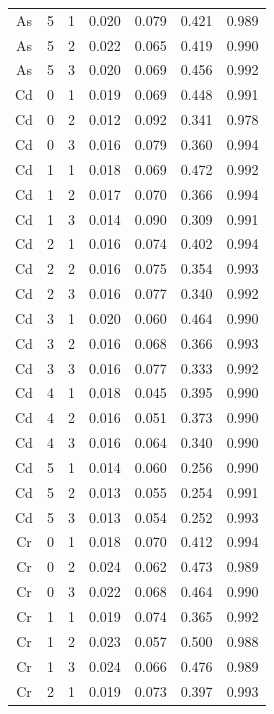 \documentclass[ms, hidelinks]{uncgdissertationexp3}
\theoremstyle{plain}
\theoremstyle{definition}
\theoremstyle{remark}
\begin{document}
\begin{longtable}{ccccccc}
  As & 5 & 1 & 0.020 & 0.079 & 0.421 & 0.989\\
  \rowcolor{gray!6}  As & 5 & 2 & 0.022 & 0.065 & 0.419 & 0.990\\
  As & 5 & 3 & 0.020 & 0.069 & 0.456 & 0.992\\
  \rowcolor{gray!6}  Cd & 0 & 1 & 0.019 & 0.069 & 0.448 & 0.991\\
  Cd & 0 & 2 & 0.012 & 0.092 & 0.341 & 0.978\\
  \rowcolor{gray!6}  Cd & 0 & 3 & 0.016 & 0.079 & 0.360 & 0.994\\
  Cd & 1 & 1 & 0.018 & 0.069 & 0.472 & 0.992\\
  \rowcolor{gray!6}  Cd & 1 & 2 & 0.017 & 0.070 & 0.366 & 0.994\\
  Cd & 1 & 3 & 0.014 & 0.090 & 0.309 & 0.991\\
  \rowcolor{gray!6}  Cd & 2 & 1 & 0.016 & 0.074 & 0.402 & 0.994\\
  Cd & 2 & 2 & 0.016 & 0.075 & 0.354 & 0.993\\
  \rowcolor{gray!6}  Cd & 2 & 3 & 0.016 & 0.077 & 0.340 & 0.992\\
  Cd & 3 & 1 & 0.020 & 0.060 & 0.464 & 0.990\\
  \rowcolor{gray!6}  Cd & 3 & 2 & 0.016 & 0.068 & 0.366 & 0.993\\
  Cd & 3 & 3 & 0.016 & 0.077 & 0.333 & 0.992\\
  \rowcolor{gray!6}  Cd & 4 & 1 & 0.018 & 0.045 & 0.395 & 0.990\\
  Cd & 4 & 2 & 0.016 & 0.051 & 0.373 & 0.990\\
  \rowcolor{gray!6}  Cd & 4 & 3 & 0.016 & 0.064 & 0.340 & 0.990\\
  Cd & 5 & 1 & 0.014 & 0.060 & 0.256 & 0.990\\
  \rowcolor{gray!6}  Cd & 5 & 2 & 0.013 & 0.055 & 0.254 & 0.991\\
  Cd & 5 & 3 & 0.013 & 0.054 & 0.252 & 0.993\\
  \rowcolor{gray!6}  Cr & 0 & 1 & 0.018 & 0.070 & 0.412 & 0.994\\
  Cr & 0 & 2 & 0.024 & 0.062 & 0.473 & 0.989\\
  \rowcolor{gray!6}  Cr & 0 & 3 & 0.022 & 0.068 & 0.464 & 0.990\\
  Cr & 1 & 1 & 0.019 & 0.074 & 0.365 & 0.992\\
  \rowcolor{gray!6}  Cr & 1 & 2 & 0.023 & 0.057 & 0.500 & 0.988\\
  Cr & 1 & 3 & 0.024 & 0.066 & 0.476 & 0.989\\
  \rowcolor{gray!6}  Cr & 2 & 1 & 0.019 & 0.073 & 0.397 & 0.993\\

\end{longtable}
\end{document}
